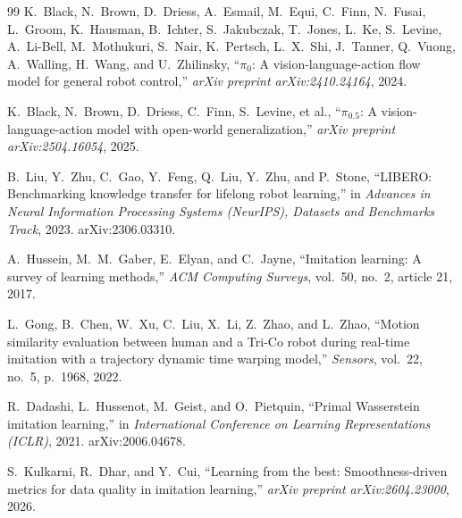 \documentclass[11pt]{article}
\numberwithin{equation}{section}
\numberwithin{table}{section}
\numberwithin{figure}{section}
\begin{document}
\begin{thebibliography}{99}
K.~Black, N.~Brown, D.~Driess, A.~Esmail, M.~Equi, C.~Finn, N.~Fusai, L.~Groom, K.~Hausman, B.~Ichter,
S.~Jakubczak, T.~Jones, L.~Ke, S.~Levine, A.~Li-Bell, M.~Mothukuri, S.~Nair, K.~Pertsch, L.~X.~Shi,
J.~Tanner, Q.~Vuong, A.~Walling, H.~Wang, and U.~Zhilinsky, ``$\pi_0$: A vision-language-action flow model
for general robot control,'' \emph{arXiv preprint arXiv:2410.24164}, 2024.

K.~Black, N.~Brown, D.~Driess, C.~Finn, S.~Levine, et al., ``$\pi_{0.5}$: A vision-language-action model
with open-world generalization,'' \emph{arXiv preprint arXiv:2504.16054}, 2025.

B.~Liu, Y.~Zhu, C.~Gao, Y.~Feng, Q.~Liu, Y.~Zhu, and P.~Stone, ``LIBERO: Benchmarking knowledge transfer
for lifelong robot learning,'' in \emph{Advances in Neural Information Processing Systems (NeurIPS),
Datasets and Benchmarks Track}, 2023. arXiv:2306.03310.

A.~Hussein, M.~M.~Gaber, E.~Elyan, and C.~Jayne, ``Imitation learning: A survey of learning methods,''
\emph{ACM Computing Surveys}, vol.~50, no.~2, article 21, 2017.

L.~Gong, B.~Chen, W.~Xu, C.~Liu, X.~Li, Z.~Zhao, and L.~Zhao, ``Motion similarity evaluation between
human and a Tri-Co robot during real-time imitation with a trajectory dynamic time warping model,''
\emph{Sensors}, vol.~22, no.~5, p.~1968, 2022.

R.~Dadashi, L.~Hussenot, M.~Geist, and O.~Pietquin, ``Primal Wasserstein imitation learning,'' in
\emph{International Conference on Learning Representations (ICLR)}, 2021. arXiv:2006.04678.

S.~Kulkarni, R.~Dhar, and Y.~Cui, ``Learning from the best: Smoothness-driven metrics for data quality in
imitation learning,'' \emph{arXiv preprint arXiv:2604.23000}, 2026.

\end{thebibliography}
\end{document}
